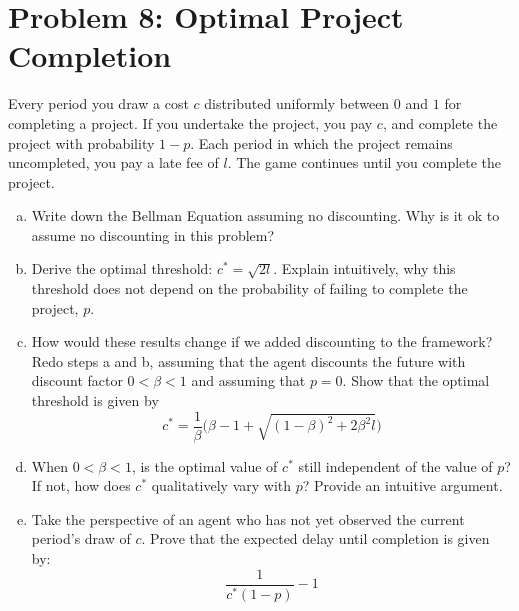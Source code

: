 \documentclass[11pt]{extarticle}
\theoremstyle{plain}
\theoremstyle{definition}
\begin{document}
\vspace{5mm}
\section*{Problem 8: Optimal Project Completion}

Every period you draw a cost $c$ distributed uniformly between $0$ and $1$ for completing a project. If you undertake the project, you pay $c$, and complete the project with probability $1-p$. Each period in which the project remains uncompleted, you pay a late fee of $l$. The game continues until you complete the project.


\vspace{2mm}
\begin{enumerate}[(a)]
\item Write down the Bellman Equation assuming no discounting. Why is it ok to assume no discounting in this problem?

\item Derive the optimal threshold: $c^* = \sqrt{2l}$. Explain intuitively, why this threshold does not depend on the probability of failing to complete the project, $p$. 

\item How would these results change if we added discounting to the framework? Redo steps a and b, assuming that the agent discounts the future with discount factor $0 < \beta < 1$ and assuming that $p = 0$. Show that the optimal threshold is given by
\begin{equation*}
	c^* = \frac{1}{\beta} \bigg( \beta - 1 + \sqrt{ (1-\beta)^2 + 2 \beta^2 l } \bigg)
\end{equation*}

\item When $0 < \beta < 1$, is the optimal value of $c^*$ still independent of the value of $p$? If not, how does $c^*$ qualitatively vary with $p$? Provide an intuitive argument.

\item Take the perspective of an agent who has not yet observed the current period's draw of $c$. Prove that the expected delay until completion is given by:
\begin{equation*}
	\frac{1}{c^*(1-p)} - 1
\end{equation*}

\end{enumerate}
\end{document}
